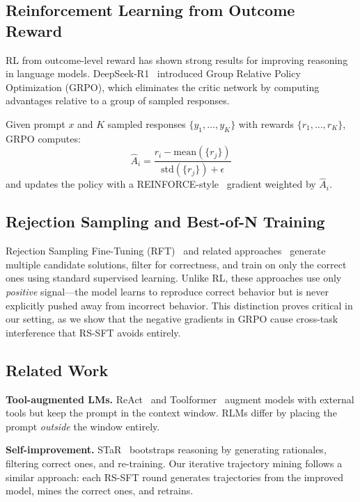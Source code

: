 \documentclass{article}
\begin{document}
\subsection{Reinforcement Learning from Outcome Reward}

RL from outcome-level reward has shown strong results for improving reasoning in language models. DeepSeek-R1~\cite{deepseekr1} introduced Group Relative Policy Optimization (GRPO), which eliminates the critic network by computing advantages relative to a group of sampled responses.

Given prompt $x$ and $K$ sampled responses $\{y_1, \ldots, y_K\}$ with rewards $\{r_1, \ldots, r_K\}$, GRPO computes:
\begin{equation}
\hat{A}_i = \frac{r_i - \text{mean}(\{r_j\})}{\text{std}(\{r_j\}) + \epsilon}
\label{eq:grpo}
\end{equation}
and updates the policy with a REINFORCE-style~\cite{williams1992reinforce} gradient weighted by $\hat{A}_i$.

\subsection{Rejection Sampling and Best-of-N Training}

Rejection Sampling Fine-Tuning (RFT)~\cite{yuan2024rft} and related approaches~\cite{cobbe2021gsm8k,singh2024humanevalfix} generate multiple candidate solutions, filter for correctness, and train on only the correct ones using standard supervised learning. Unlike RL, these approaches use only \emph{positive} signal---the model learns to reproduce correct behavior but is never explicitly pushed away from incorrect behavior. This distinction proves critical in our setting, as we show that the negative gradients in GRPO cause cross-task interference that RS-SFT avoids entirely.

\subsection{Related Work}

\textbf{Tool-augmented LMs.} ReAct~\cite{yao2023react} and Toolformer~\cite{schick2023toolformer} augment models with external tools but keep the prompt in the context window. RLMs differ by placing the prompt \emph{outside} the window entirely.

\textbf{Self-improvement.} STaR~\cite{zelikman2022star} bootstraps reasoning by generating rationales, filtering correct ones, and re-training. Our iterative trajectory mining follows a similar approach: each RS-SFT round generates trajectories from the improved model, mines the correct ones, and retrains.
\end{document}
